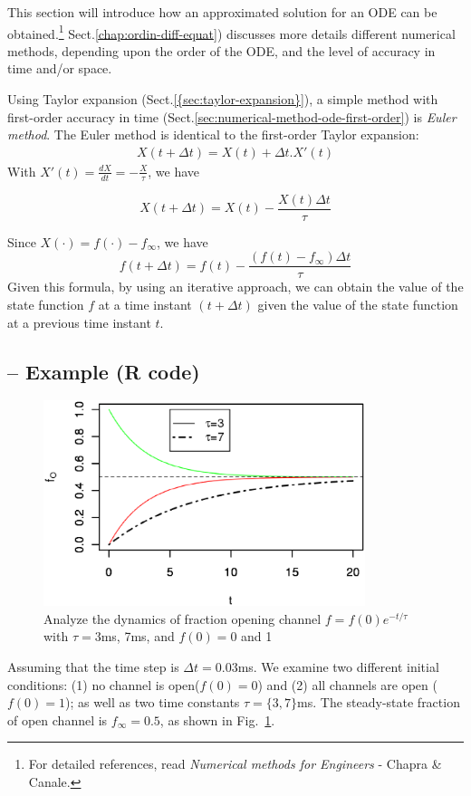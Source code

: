 This section will introduce how an approximated solution for an ODE can be
obtained.\footnote{For detailed references, read
  {\it Numerical methods for Engineers} - Chapra \& Canale.}
Sect.\ref{chap:ordin-diff-equat}) discusses more details different numerical
methods, depending upon the order of the ODE, and the level of accuracy in time
and/or space.

Using Taylor expansion (Sect.\ref{{sec:taylor-expansion}}), a simple method with
first-order accuracy in time (Sect.\ref{sec:numerical-method-ode-first-order})
is {\it Euler method}. The Euler method is identical to the first-order Taylor
expansion:
\begin{eqnarray*}
  X(t+\Delta t) = X(t) + \Delta t .X'(t)
\end{eqnarray*}
With $X'(t) = \frac{dX}{dt}=-\frac{X}{\tau}$, we have

\begin{equation}
  \label{eq:17}
  X(t + \Delta t) = X(t) - \frac{X(t)\Delta t}{\tau}
\end{equation}

Since  $X(\cdot) = f(\cdot) - f_\infty$, we have
\begin{equation}
  \label{eq:18}
  f(t+\Delta t) = f(t) - \frac{(f(t) - f_\infty)\Delta t}{\tau}
\end{equation}
Given this formula, by using an iterative approach, we can obtain the
value of the state function $f$ at a time instant $(t+\Delta t)$ given
the value of the state function at a previous time instant $t$.

\subsection{-- Example (R code)}
\label{sec:example-r-code}


\begin{figure}[htb]
  \centerline{\includegraphics[height=6cm]{./images/gating_numerical.eps}}
  \caption{Analyze the dynamics of fraction opening channel
    $f=f(0)e^{-t/\tau}$ with $\tau=3$ms, 7ms, and $f(0) = 0$ and
    1}\label{fig:gating-numerical}
\end{figure}
Assuming that the time step is $\Delta t = 0.03$ms. We examine two
different initial conditions: (1) no channel is open($f(0) = 0$) and
(2) all channels are open ($f(0)=1$); as well as two time constants
$\tau = \{3, 7\}$ms. The steady-state fraction of open channel is
$f_\infty = 0.5$, as shown in Fig.~\ref{fig:gating-numerical}.

